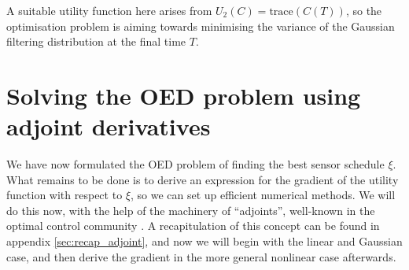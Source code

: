 \documentclass[10pt]{article}
\numberwithin{equation}{section}
\numberwithin{figure}{section}
\theoremstyle{remark}
\newcommand{\tr}{\mathrm{trace}}
\begin{document}
A suitable utility function here arises from $U_2(C) = \tr(C(T))$, so the optimisation problem is aiming towards minimising the variance of the Gaussian filtering distribution at the final time $T$.





\section{Solving the OED problem using adjoint derivatives}\label{sec:solvingOED}
We have now formulated the OED problem of finding the best sensor schedule $\xi$. What remains to be done is to derive an expression for the gradient of the utility function with respect to $\xi$, so we can set up efficient numerical methods. We will do this now, with the help of the machinery of ``adjoints'', well-known in the optimal control community \cite{giles2002adjoint,giles2006smoking}. A recapitulation of this concept can be found in appendix \ref{sec:recap_adjoint}, and now we will begin with the linear and Gaussian case, and then derive the gradient in the more general nonlinear case afterwards. 
\end{document}
